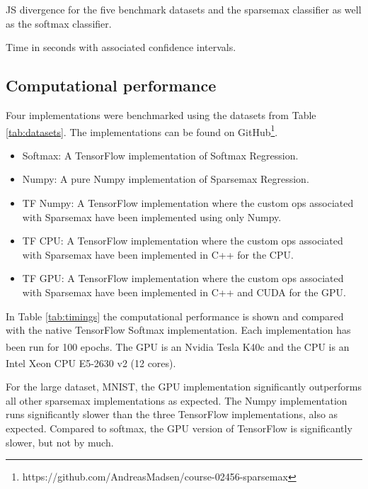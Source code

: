 \begin{table}[H]
\centering

\caption{JS divergence for the five benchmark datasets and the sparsemax classifier as well as the softmax classifier.}
\label{tab:results}
\end{table}

\begin{table}
\centering

\caption{Time in seconds with associated confidence intervals.}
\label{tab:timings}
\end{table}

\subsection{Computational performance}
Four implementations were benchmarked using the datasets from Table \ref{tab:datasets}. The implementations can be found on GitHub\footnote{https://github.com/AndreasMadsen/course-02456-sparsemax}.
\begin{itemize}
\setlength\itemsep{-0.3em}
\item Softmax: A TensorFlow implementation of Softmax Regression.
\item Numpy: A pure Numpy implementation of Sparsemax Regression.
\item TF Numpy: A TensorFlow implementation where the custom ops associated with Sparsemax have been implemented using only Numpy.
\item TF CPU: A TensorFlow implementation where the custom ops associated with Sparsemax have been implemented in C++ for the CPU.
\item TF GPU: A TensorFlow implementation where the custom ops associated with Sparsemax have been implemented in C++ and CUDA for the GPU.
\end{itemize}

In Table \ref{tab:timings} the computational performance is shown and compared with the native TensorFlow Softmax implementation. Each implementation has been run for 100 epochs. The GPU is an Nvidia\textsuperscript{\textregistered} Tesla K40c and the CPU is an Intel\textsuperscript{\textregistered} Xeon\textsuperscript{\textregistered} CPU E5-2630 v2 (12 cores).

For the large dataset, MNIST, the GPU implementation significantly outperforms all other sparsemax implementations as expected. The Numpy implementation runs significantly slower than the three TensorFlow implementations, also as expected. Compared to softmax, the GPU version of TensorFlow is significantly slower, but not by much.

